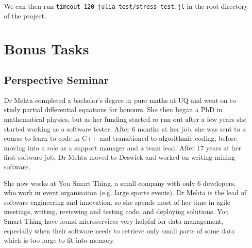 \documentclass{article}
\theoremstyle{plain}
\numberwithin{theorem}{section}
\numberwithin{example}{section}
\theoremstyle{definition}
\numberwithin{definition}{section}
\begin{document}
We can then run \texttt{timeout 120 julia test/stress\_test.jl} in the root
directory of the project.

\bigbreak

\section{Bonus Tasks}
\subsection{Perspective Seminar}
Dr Mehta completed a bachelor's degree in pure maths at UQ and went on to study
partial differential equations for honours. She then began a PhD in mathematical
physics, but as her funding started ro run out after a few years she started
working as a software tester. After 6 months at her job, she was sent to a
course to learn to code in C++ and transitioned to algorithmic coding, before
moving into a role as a support manager and a team lead. After 17 years at her
first software job, Dr Mehta moved to Deswick and worked on writing mining
software. \medbreak

She now works at You Smart Thing, a small company with only 6 developers, who
work in event organisation (e.g. large sports events). Dr Mehta is the lead of
software engineering and innovation, so she spends most of her time in agile
meetings, writing, reviewing and testing code, and deploying solutions. You
Smart Thing have found microservices very helpful for data management,
especially when their software needs to retrieve only small parts of some data
which is too large to fit into memory.
\end{document}
